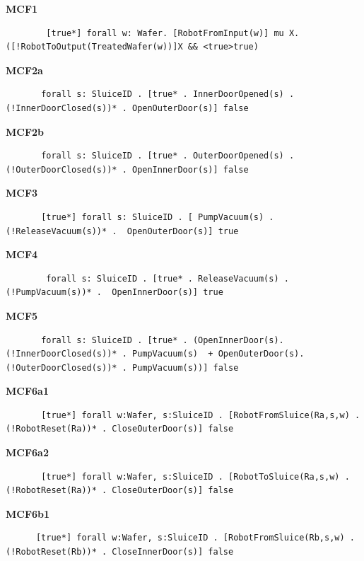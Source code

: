 \documentclass[12pt]{report}
\begin{document}
    \textbf{MCF1}
    \begin{lstlisting}
    	[true*] forall w: Wafer. [RobotFromInput(w)] mu X. ([!RobotToOutput(TreatedWafer(w))]X && <true>true)
    \end{lstlisting}

    \textbf{MCF2a}
    \begin{lstlisting}
       forall s: SluiceID . [true* . InnerDoorOpened(s) . (!InnerDoorClosed(s))* . OpenOuterDoor(s)] false
       \end{lstlisting}

    \textbf{MCF2b}
    \begin{lstlisting}
       forall s: SluiceID . [true* . OuterDoorOpened(s) . (!OuterDoorClosed(s))* . OpenInnerDoor(s)] false
       \end{lstlisting}

    \textbf{MCF3}
    \begin{lstlisting}
       [true*] forall s: SluiceID . [ PumpVacuum(s) . (!ReleaseVacuum(s))* .  OpenOuterDoor(s)] true
       \end{lstlisting}

    \textbf{MCF4}
    \begin{lstlisting}
        forall s: SluiceID . [true* . ReleaseVacuum(s) . (!PumpVacuum(s))* .  OpenInnerDoor(s)] true
        \end{lstlisting}

    \textbf{MCF5}
    \begin{lstlisting}
       forall s: SluiceID . [true* . (OpenInnerDoor(s). (!InnerDoorClosed(s))* . PumpVacuum(s)  + OpenOuterDoor(s). (!OuterDoorClosed(s))* . PumpVacuum(s))] false
       \end{lstlisting}

    \textbf{MCF6a1}
    \begin{lstlisting}
       [true*] forall w:Wafer, s:SluiceID . [RobotFromSluice(Ra,s,w) . (!RobotReset(Ra))* . CloseOuterDoor(s)] false
       \end{lstlisting}

    \textbf{MCF6a2}
    \begin{lstlisting}
       [true*] forall w:Wafer, s:SluiceID . [RobotToSluice(Ra,s,w) . (!RobotReset(Ra))* . CloseOuterDoor(s)] false
    \end{lstlisting}
	
    \textbf{MCF6b1}
    \begin{lstlisting}
      [true*] forall w:Wafer, s:SluiceID . [RobotFromSluice(Rb,s,w) . (!RobotReset(Rb))* . CloseInnerDoor(s)] false
    \end{lstlisting}
\end{document}
